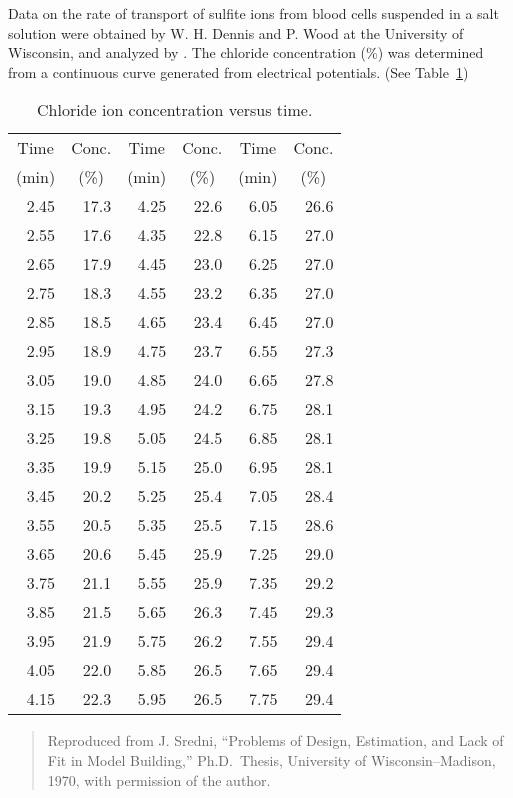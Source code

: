 Data on the rate of transport of sulfite ions from blood cells
suspended in a salt solution were obtained by W. H. Dennis and
P. Wood at the University of Wisconsin, and analyzed by .
The chloride concentration (\%) was determined from a continuous curve
generated from electrical potentials.
(See Table~\ref{atbl:chlor})
\begin{table}
  \caption{\label{atbl:chlor}
  Chloride ion concentration versus time.}
  \begin{center}
    \begin{tabular}{r r r r r r}\hline
      \multicolumn{1}{c}{Time}&\multicolumn{1}{c}{Conc.}&
      \multicolumn{1}{c}{Time}&\multicolumn{1}{c}{Conc.}&
      \multicolumn{1}{c}{Time}&\multicolumn{1}{c}{Conc.}\\
      \multicolumn{1}{c}{(min)}&\multicolumn{1}{c}{(\%)}&
      \multicolumn{1}{c}{(min)}&\multicolumn{1}{c}{(\%)}&
      \multicolumn{1}{c}{(min)}&\multicolumn{1}{c}{(\%)}\\
      \hline
      2.45&17.3&4.25&22.6&6.05&26.6\\
      2.55&17.6&4.35&22.8&6.15&27.0\\
      2.65&17.9&4.45&23.0&6.25&27.0\\
      2.75&18.3&4.55&23.2&6.35&27.0\\
      2.85&18.5&4.65&23.4&6.45&27.0\\
      2.95&18.9&4.75&23.7&6.55&27.3\\
      3.05&19.0&4.85&24.0&6.65&27.8\\
      3.15&19.3&4.95&24.2&6.75&28.1\\
      3.25&19.8&5.05&24.5&6.85&28.1\\
      3.35&19.9&5.15&25.0&6.95&28.1\\
      3.45&20.2&5.25&25.4&7.05&28.4\\
      3.55&20.5&5.35&25.5&7.15&28.6\\
      3.65&20.6&5.45&25.9&7.25&29.0\\
      3.75&21.1&5.55&25.9&7.35&29.2\\
      3.85&21.5&5.65&26.3&7.45&29.3\\
      3.95&21.9&5.75&26.2&7.55&29.4\\
      4.05&22.0&5.85&26.5&7.65&29.4\\
      4.15&22.3&5.95&26.5&7.75&29.4\\
      \hline
    \end{tabular}
  \end{center}
\begin{quote}\small
  Reproduced from J. Sredni, ``Problems of Design, Estimation, and Lack
  of Fit in Model Building,'' Ph.D.~Thesis, University of
  Wisconsin--Madison, 1970, with permission of the author.
\end{quote}
\end{table}

